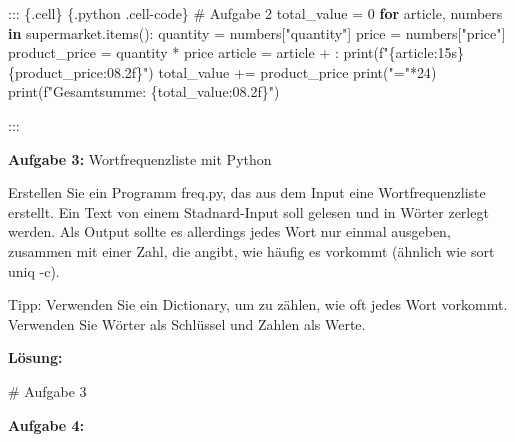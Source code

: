 \documentclass[
  11pt,
  a4paper,
  DIV=11,
  numbers=noendperiod]{scrartcl}
\newenvironment{Shaded}{\begin{snugshade}}{\end{snugshade}}
\newcommand{\BuiltInTok}[1]{\textcolor[rgb]{0.00,0.23,0.31}{#1}}
\newcommand{\CommentTok}[1]{\textcolor[rgb]{0.37,0.37,0.37}{#1}}
\newcommand{\ControlFlowTok}[1]{\textcolor[rgb]{0.00,0.23,0.31}{\textbf{#1}}}
\newcommand{\DecValTok}[1]{\textcolor[rgb]{0.68,0.00,0.00}{#1}}
\newcommand{\KeywordTok}[1]{\textcolor[rgb]{0.00,0.23,0.31}{\textbf{#1}}}
\newcommand{\NormalTok}[1]{\textcolor[rgb]{0.00,0.23,0.31}{#1}}
\newcommand{\OperatorTok}[1]{\textcolor[rgb]{0.37,0.37,0.37}{#1}}
\newcommand{\SpecialCharTok}[1]{\textcolor[rgb]{0.37,0.37,0.37}{#1}}
\newcommand{\SpecialStringTok}[1]{\textcolor[rgb]{0.13,0.47,0.30}{#1}}
\newcommand{\StringTok}[1]{\textcolor[rgb]{0.13,0.47,0.30}{#1}}
\begin{document}
\begin{Shaded}
\begin{Highlighting}[numbers=left,,]
\NormalTok{::: \{.cell\}}
\NormalTok{\textasciigrave{}\textasciigrave{}\textasciigrave{} \{.python .cell}\OperatorTok{{-}}\NormalTok{code\}}
\CommentTok{\# Aufgabe 2}
\NormalTok{total\_value }\OperatorTok{=} \DecValTok{0}
\ControlFlowTok{for}\NormalTok{ article, numbers }\KeywordTok{in}\NormalTok{ supermarket.items():}
\NormalTok{    quantity }\OperatorTok{=}\NormalTok{ numbers[}\StringTok{"quantity"}\NormalTok{]}
\NormalTok{    price }\OperatorTok{=}\NormalTok{ numbers[}\StringTok{"price"}\NormalTok{]}
\NormalTok{    product\_price }\OperatorTok{=}\NormalTok{ quantity }\OperatorTok{*}\NormalTok{ price}
\NormalTok{    article }\OperatorTok{=}\NormalTok{ article }\OperatorTok{+} \StringTok{\textquotesingle{}:\textquotesingle{}}
    \BuiltInTok{print}\NormalTok{(}\SpecialStringTok{f"}\SpecialCharTok{\{}\NormalTok{article}\SpecialCharTok{:15s\}}\SpecialStringTok{ }\SpecialCharTok{\{}\NormalTok{product\_price}\SpecialCharTok{:08.2f\}}\SpecialStringTok{"}\NormalTok{)}
\NormalTok{    total\_value }\OperatorTok{+=}\NormalTok{ product\_price}
\BuiltInTok{print}\NormalTok{(}\StringTok{"="}\OperatorTok{*}\DecValTok{24}\NormalTok{)   }
\BuiltInTok{print}\NormalTok{(}\SpecialStringTok{f"Gesamtsumme:    }\SpecialCharTok{\{}\NormalTok{total\_value}\SpecialCharTok{:08.2f\}}\SpecialStringTok{"}\NormalTok{)}
\end{Highlighting}
\end{Shaded}

:::

\textbf{Aufgabe 3:} Wortfrequenzliste mit Python

Erstellen Sie ein Programm freq.py, das aus dem Input eine
Wortfrequenzliste erstellt. Ein Text von einem Stadnard-Input soll
gelesen und in Wörter zerlegt werden. Als Output sollte es allerdings
jedes Wort nur einmal ausgeben, zusammen mit einer Zahl, die angibt, wie
häufig es vorkommt (ähnlich wie sort \textbar{} uniq -c).

Tipp: Verwenden Sie ein Dictionary, um zu zählen, wie oft jedes Wort
vorkommt. Verwenden Sie Wörter als Schlüssel und Zahlen als Werte.

\textbf{Lösung:}

\begin{Shaded}
\begin{Highlighting}[numbers=left,,]
\CommentTok{\# Aufgabe 3}
\end{Highlighting}
\end{Shaded}

\textbf{Aufgabe 4:}
\end{document}
